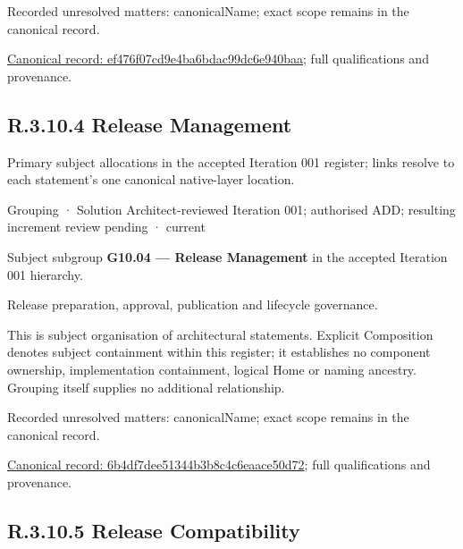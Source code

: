 {\small Recorded unresolved matters: canonicalName; exact scope remains in the canonical record.}\par
{\footnotesize \href{../../../../continuum/grouping/ef476f07cd9e4ba6bdac99dc6e940baa.md}{Canonical record: ef476f07cd9e4ba6bdac99dc6e940baa}; full qualifications and provenance.}\par
\subsection*{R.3.10.4 Release Management}
\label{navigation:R.3.10.4}

Primary subject allocations in the accepted Iteration 001 register; links resolve to each statement’s one canonical native-layer location.\par
\label{element:6b4df7dee51344b3b8c4c6eaace50d72}
{\small Grouping · Solution Architect-reviewed Iteration 001; authorised ADD; resulting increment review pending · current}\par

Subject subgroup \textbf{G10.04 — Release Management} in the accepted Iteration 001 hierarchy.



Release preparation, approval, publication and lifecycle governance.



This is subject organisation of architectural statements. Explicit Composition denotes subject containment within this register; it establishes no component ownership, implementation containment, logical Home or naming ancestry. Grouping itself supplies no additional relationship.


{\small Recorded unresolved matters: canonicalName; exact scope remains in the canonical record.}\par
{\footnotesize \href{../../../../continuum/grouping/6b4df7dee51344b3b8c4c6eaace50d72.md}{Canonical record: 6b4df7dee51344b3b8c4c6eaace50d72}; full qualifications and provenance.}\par
\subsection*{R.3.10.5 Release Compatibility}
\label{navigation:R.3.10.5}

